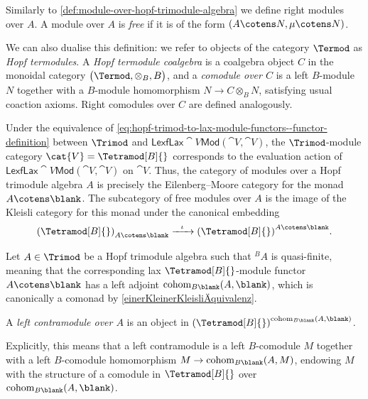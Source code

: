 Similarly to \cref{def:module-over-hopf-trimodule-algebra} we define right modules over \(A\).
A module over \(A\) is \emph{free} if it is of the form \((A \cotens N, \mu \cotens N)\).

We can also dualise this definition:
we refer to objects of the category \(\Termod\) as \emph{Hopf termodules}.
A \emph{Hopf termodule coalgebra} is a coalgebra object \(C\) in the monoidal category \(\big(\Termod, \otimes_{B}, B\big)\),
and a \emph{comodule over \(C\)} is a left \(B\)\hyp{}module \(N\) together with a \(B\)\hyp{}module homomorphism \(N \to C \otimes_{B} N\),
satisfying usual coaction axioms.
Right comodules over \(C\) are defined analogously.

\begin{remark}
  Under the equivalence of \cref{eq:hopf-trimod-to-lax-module-functors--functor-definition}
  between \(\Trimod\) and \(\mathsf{LexfLax}\cat{V}\mathsf{Mod}(\cat{V}, \cat{V})\),
  the \(\Trimod\)\hyp{}module category \(\cat{V} = \Tetramod[B]{}\) corresponds to
  the evaluation action of \(\mathsf{LexfLax}\cat{V}\mathsf{Mod}(\cat{V}, \cat{V})\) on \(\cat{V}\).
  Thus, the category of modules over a Hopf trimodule algebra \(A\) is precisely
  the Eilenberg--Moore category for the monad \(A \cotens \blank\).
  The subcategory of free modules over \(A\) is
  the image of the Kleisli category for this monad
  under the canonical embedding
  \[
    {(\Tetramod[B]{})}_{A \cotens \blank} \xrightarrow{\ \ \iota\ \ } {(\Tetramod[B]{})}^{A \cotens \blank}.
  \]
\end{remark}

Let \(A \in \Trimod\) be a Hopf trimodule algebra
such that \({}^{B}A\) is quasi-finite,
meaning that the corresponding lax \(\Tetramod[B]{}\)\hyp{}module functor \(A \cotens \blank\) has a left adjoint \(\mathrm{cohom}_{B\blank}(A,\blank)\),
which is canonically a comonad by \cref{einerKleinerKleisliÄquivalenz}.

\begin{definition}\label{contramodules}
  A \emph{left contramodule over \(A\)} is an object in \({(\Tetramod[B]{})}^{\mathrm{cohom}_{B\blank}(A,\blank)}\).

  Explicitly, this means that a left contramodule is a left \(B\)\hyp{}comodule \(M\)
  together with a left \(B\)\hyp{}comodule homomorphism \(M \to \mathrm{cohom}_{B\blank}(A,M)\),
  endowing \(M\) with the structure of a comodule in \(\Tetramod[B]{}\) over \(\mathrm{cohom}_{B\blank}(A,\blank)\).
\end{definition}


